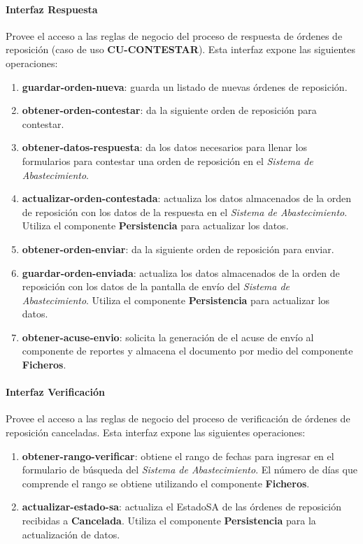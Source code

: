 \paragraph{\indent Interfaz Respuesta\\}
Provee el acceso a las reglas de negocio del proceso de respuesta de órdenes de reposición (caso de uso \textbf{CU-CONTESTAR}). Esta interfaz expone las siguientes operaciones:
\begin{enumerate}
	\item \textbf{guardar-orden-nueva}: guarda un listado de nuevas órdenes de reposición.
	\item \textbf{obtener-orden-contestar}: da la siguiente orden de reposición para contestar.
	\item \textbf{obtener-datos-respuesta}: da los datos necesarios para llenar los formularios para contestar una orden de reposición en el \textit{Sistema de Abastecimiento}.
	\item \textbf{actualizar-orden-contestada}: actualiza los datos almacenados de la orden de reposición con los datos de la respuesta en el \textit{Sistema de Abastecimiento}. Utiliza el componente \textbf{Persistencia} para actualizar los datos.
	\item \textbf{obtener-orden-enviar}: da la siguiente orden de reposición para enviar.
	\item \textbf{guardar-orden-enviada}: actualiza los datos almacenados de la orden de reposición con los datos de la pantalla de envío del \textit{Sistema de Abastecimiento}. Utiliza el componente \textbf{Persistencia} para actualizar los datos.
	\item \textbf{obtener-acuse-envio}: solicita la generación de el acuse de envío al componente de reportes y almacena el documento por medio del componente \textbf{Ficheros}.
\end{enumerate}
\paragraph{\indent Interfaz Verificación\\}
Provee el acceso a las reglas de negocio del proceso de verificación de órdenes de reposición canceladas. Esta interfaz expone las siguientes operaciones:
\begin{enumerate}
	\item \textbf{obtener-rango-verificar}: obtiene el rango de fechas para ingresar en el formulario de búsqueda del \textit{Sistema de Abastecimiento}. El número de días que comprende el rango se obtiene utilizando el componente \textbf{Ficheros}.
	\item \textbf{actualizar-estado-sa}: actualiza el EstadoSA de las órdenes de reposición recibidas a \textbf{Cancelada}. Utiliza el componente \textbf{Persistencia} para la actualización de datos.
\end{enumerate}
